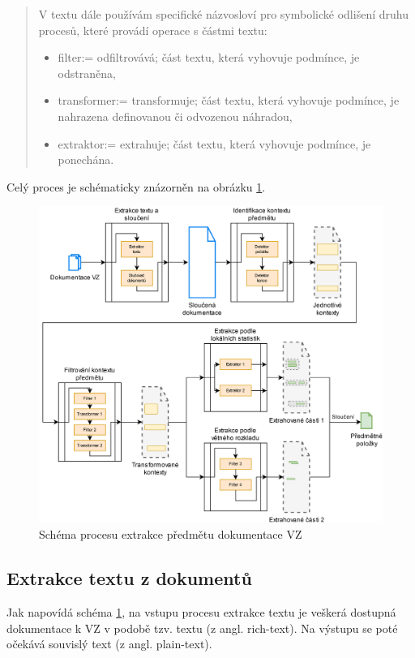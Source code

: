 \documentclass[thesis=M,czech]{FITthesis}[2019/12/23]
\begin{document}
\begin{quote}
    V textu dále používám specifické názvosloví pro symbolické odlišení druhu procesů, které provádí operace s částmi textu:
    \begin{itemize}
        \item filter:= odfiltrovává; část textu, která vyhovuje podmínce, je odstraněna,
        \item transformer:= transformuje; část textu, která vyhovuje podmínce, je nahrazena definovanou či odvozenou náhradou,
        \item extraktor:= extrahuje; část textu, která vyhovuje podmínce, je ponechána.
    \end{itemize}
\end{quote}

Celý proces je schématicky znázorněn na obrázku \ref{fig:subjextraction}.
\begin{figure}\centering
	\includegraphics[width=1\textwidth]{images/subj_extraction.png}
	\caption{Schéma procesu extrakce předmětu dokumentace VZ}\label{fig:subjextraction}
\end{figure}


\subsection{Extrakce textu z dokumentů}
Jak napovídá schéma \ref{fig:subjextraction}, na vstupu procesu extrakce textu je veškerá dostupná dokumentace k VZ v podobě tzv.  textu (z angl. rich-text). Na výstupu se poté očekává souvislý  text (z angl. plain-text).
\end{document}
